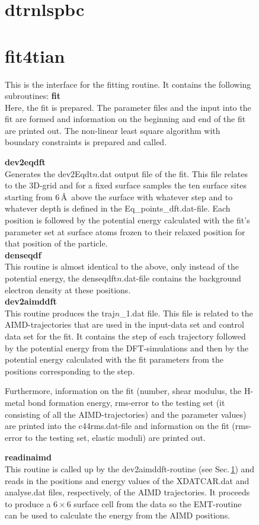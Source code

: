 \documentclass[twoside, 11pt, titlepage, captions=nooneline, a4paper, headsepline]{scrbook}%
\newcommand{\9}{\mathrm}
\newcommand{\0}{\,\mathrm}
\begin{document}
\begin{figure}[b!]
\section{dtrnlspbc}
\section{fit4tian}
This is the interface for the fitting routine. It contains the following subroutines:
\textbf{fit}\\
Here, the fit is prepared. The parameter files and the input into the fit are formed and information on the beginning and end of the fit are printed out. The non-linear least square algorithm with boundary constraints is prepared and called.
 
\noindent\textbf{dev2eqdft}\\
Generates the dev2Eqdt$n$.dat output file of the fit. This file relates to the 3D-grid and for a fixed surface samples the ten surface sites starting from 6\,\AA~above the surface with whatever step and to whatever depth is defined in the Eq\_points\_dft.dat-file. Each position is followed by the potential energy calculated with the fit's parameter set at surface atoms frozen to their relaxed position for that position of the particle.\\
\textbf{denseqdf}\\
This routine is almost identical to the above, only instead of the potential energy, the denseqdft$n$.dat-file contains the background electron density at these positions.\\
\textbf{dev2aimddft}\\
\label{Sec:Function:f4t:dev2aimd}
This routine produces the traj$n$\_1.dat file. This file is related to the AIMD-trajectories that are used in the input-data set and control data set for the fit. It contains the step of each trajectory followed by the potential energy from the DFT-simulations and then by the potential energy calculated with the fit parameters from the positions corresponding to the step.

Furthermore, information on the fit (number, shear modulus, the H-metal bond formation energy, rms-error to the testing set (it consisting of all the AIMD-trajectories) and the parameter values) are printed into the c44rms.dat-file and information on the fit (rms-error to the testing set, elastic moduli) are printed out.

\textbf{readinaimd}\\
This routine is called up by the dev2aimddft-routine (see Sec.\,\ref{Sec:Function:f4t:dev2aimd}) and reads in the positions and energy values of the XDATCAR.dat and analyse.dat files, respectively, of the AIMD trajectories. It proceeds to produce a $6\times6$ surface cell from the data so the EMT-routine can be used to calculate the energy from the AIMD positions.


\end{figure}
\end{document}
